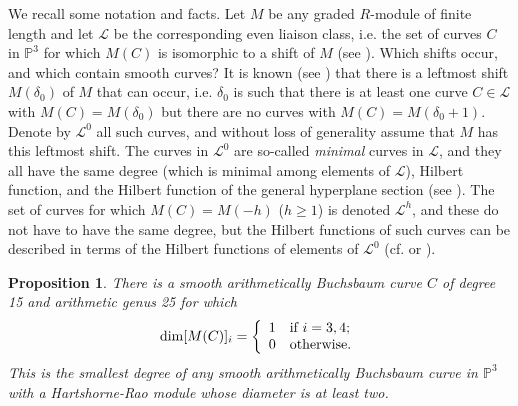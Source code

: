\documentclass[12pt]{amsart}%
\numberwithin{equation}{section}
\newtheorem{proposition}[theorem]{Proposition}
\theoremstyle{definition}
\numberwithin{equation}{section}
\begin{document}
We recall some notation and facts. Let $M$ be any graded $R$-module of finite length and let $\mathcal L$ be the corresponding even liaison class, i.e. the set of curves $C$ in $\mathbb P^3$ for which $M(C)$ is isomorphic to a shift of $M$ (see \cite{rao}). Which shifts occur, and which contain smooth curves? It is known (see \cite{BM4}) that there is a leftmost shift $M(\delta_0)$ of $M$ that can occur, i.e. $\delta_0$ is such that there is at least one curve $C \in \mathcal L$ with $M(C) = M(\delta_0)$ but there are no curves with  $M(C) = M(\delta_0 +1)$. Denote by $\mathcal L^0$ all such curves, and without loss of generality assume that $M$ has this leftmost shift. The curves in $\mathcal L^0$ are so-called {\it minimal} curves in $\mathcal L$, and they all have the same degree (which is minimal among elements of $\mathcal L$), Hilbert function, and the Hilbert function of the general hyperplane section (see \cite{BBM}). The set of curves for which $M(C) = M(-h)$ ($h \geq 1$) is denoted $\mathcal L^h$, and these do not have to have the same degree, but the Hilbert functions of such curves can be described in terms of the Hilbert functions of elements of $\mathcal L^0$ (cf. \cite{BM4} or \cite{BBM}).

\begin{proposition}\label{11buchs}
There is a smooth arithmetically Buchsbaum curve $C$ of degree 15 and arithmetic genus 25 for which 
\[
\dim [M(C)]_i = 
\left \{
\begin{array}{ll}
1 & \hbox{if } i = 3,4; \\
0 & \hbox{otherwise}.
\end{array}
\right.
\]
This is the smallest degree of any smooth arithmetically Buchsbaum curve in $\mathbb P^3$ {with a Hartshorne-Rao module whose diameter is at least two.
}
\end{proposition}
\end{document}
